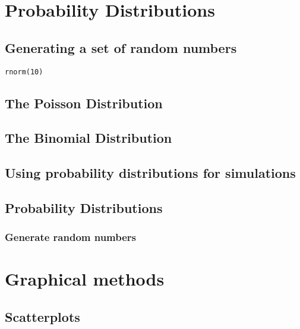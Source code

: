 \documentclass[a4paper,12pt]{article}
\begin{document}
\begin{itemize}
\newpage
\chapter{Probability Distributions}
\section{Generating a set of random numbers}

\begin{myindentpar}{1cm}
\footnotesize \begin{verbatim}
rnorm(10)
\end{verbatim}\normalsize
\end{myindentpar}

\section{The Poisson Distribution}
\section{The Binomial Distribution}
\section{Using probability distributions for simulations}
\section{Probability Distributions}
\subsection{Generate random numbers }

\newpage
\chapter{Graphical methods}

\section{Scatterplots}



\end{itemize}
\end{document}
